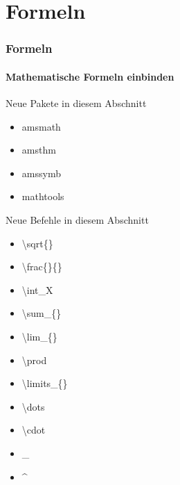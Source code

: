 \section{Formeln}
\begin{frame}
\frametitle{Formeln}
\framesubtitle{Mathematische Formeln einbinden}

\begin{exampleblock}{Neue Pakete in diesem Abschnitt}
\begin{multicols}{2}
\begin{itemize}
\item amsmath 
\item amsthm
\item amssymb
\item mathtools
\end{itemize}
\end{multicols}
\end{exampleblock}

\begin{block}{Neue Befehle in diesem Abschnitt}
\begin{multicols}{2}
\begin{itemize}
\item \color{nounibaredI}\textbackslash sqrt\color{black}\{\}
\item \color{nounibaredI}\textbackslash frac\color{black}\{\}\{\}
\item \color{nounibaredI}\textbackslash int\color{black}\_X
\item \color{nounibaredI}\textbackslash sum\color{black}\_\{\}
\item \color{nounibaredI}\textbackslash lim\color{black}\_\{\}
\item \color{nounibaredI}\textbackslash prod\color{black}
\item \color{nounibaredI}\textbackslash limits\color{black}\_\{\}
\item \color{nounibaredI}\textbackslash dots\color{black}
\item \color{nounibaredI}\textbackslash cdot\color{black}
\item \color{nounibaredI}\_\color{black}
\item \color{nounibaredI}\^~\color{black}
\end{itemize}
\end{multicols}
\end{block}

\end{frame}

